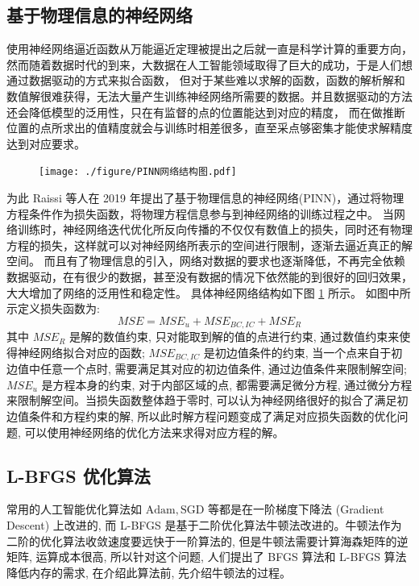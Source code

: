 \documentclass{Sichuan Normal University}
\begin{document}
\subsection{基于物理信息的神经网络}
使用神经网络逼近函数从万能逼近定理被提出之后就一直是科学计算的重要方向，然而随着数据时代的到来，大数据在人工智能领域取得了巨大的成功，于是人们想通过数据驱动的方式来拟合函数，
但对于某些难以求解的函数，函数的解析解和数值解很难获得，无法大量产生训练神经网络所需要的数据。并且数据驱动的方法还会降低模型的泛用性，只在有监督的点的位置能达到对应的精度，
而在做推断位置的点所求出的值精度就会与训练时相差很多，直至采点够密集才能使求解精度达到对应要求。
\begin{figure}[H]
    \centering
    \texttt{[image: ./figure/PINN网络结构图.pdf]}
    \label{fig:PINN Network Structure}
    \end{figure}

为此 Raissi 等人在 2019 年提出了基于物理信息的神经网络(PINN)\cite{raissiPhysicsinformedNeuralNetworks2019}，通过将物理方程条件作为损失函数，将物理方程信息参与到神经网络的训练过程之中。
当网络训练时，神经网络迭代优化所反向传播的不仅仅有数值上的损失，同时还有物理方程的损失，这样就可以对神经网络所表示的空间进行限制，逐渐去逼近真正的解空间。
而且有了物理信息的引入，网络对数据的要求也逐渐降低，不再完全依赖数据驱动，在有很少的数据，甚至没有数据的情况下依然能的到很好的回归效果，大大增加了网络的泛用性和稳定性。
具体神经网络结构如下图 \ref{fig:PINN Network Structure} 所示。
如图中所示定义损失函数为:
\begin{equation}
    M S E=M S E_u+M S E_{B C, I C}+M S E_R
    \label{eq:损失函数}  
\end{equation}
其中 $M S E_R$ 是解的数值约束, 只对能取到解的值的点进行约束, 通过数值约束来使得神经网络拟合对应的函数; $M S E_{B C, I C}$ 是初边值条件的约束, 当一个点来自于初边值中任意一个点时, 需要满足其对应的初边值条件, 通过边值条件来限制解空间; 
$M S E_u$ 是方程本身的约束, 对于内部区域的点, 都需要满足微分方程, 通过微分方程来限制解空间。当损失函数整体趋于零时, 可以认为神经网络很好的拟合了满足初边值条件和方程约束的解, 所以此时解方程问题变成了满足对应损失函数的优化问题, 可以使用神经网络的优化方法来求得对应方程的解。

\subsection{L-BFGS 优化算法}
常用的人工智能优化算法如 $\mathrm{Adam}, \mathrm{SGD}$ 等都是在一阶梯度下降法 (Gradient Descent) 上改进的, 而 L-BFGS 是基于二阶优化算法牛顿法改进的。牛顿法作为二阶的优化算法收敛速度要远快于一阶算法的, 
但是牛顿法需要计算海森矩阵的逆矩阵, 运算成本很高, 所以针对这个问题, 人们提出了 BFGS 算法和 L-BFGS 算法降低内存的需求, 在介绍此算法前, 先介绍牛顿法的过程。
\end{document}
